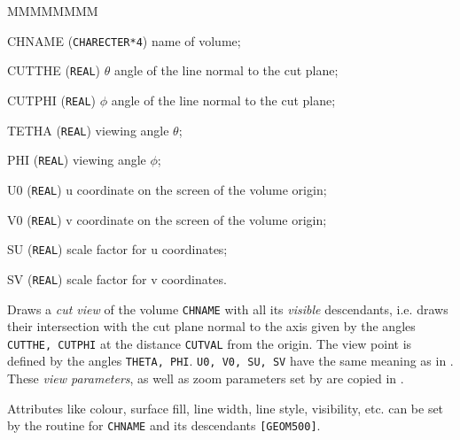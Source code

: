        
 
\begin{DLtt}{MMMMMMMM}
\item[CHNAME] ({\tt CHARECTER*4}) name of volume;
\item[CUTTHE] ({\tt REAL}) $\theta$ angle of the line normal to the cut plane;
\item[CUTPHI] ({\tt REAL}) $\phi$ angle of the line normal to the cut plane;
\item[TETHA]  ({\tt REAL}) viewing angle $\theta$;
\item[PHI]    ({\tt REAL}) viewing angle $\phi$;
\item[U0]     ({\tt REAL}) u coordinate on the screen of the volume origin;
\item[V0]     ({\tt REAL}) v  coordinate on the screen of the volume origin;
\item[SU]     ({\tt REAL}) scale factor for u  coordinates;
\item[SV]     ({\tt REAL}) scale factor for v   coordinates.
\end{DLtt}

Draws a {\it cut view} of the volume {\tt CHNAME}
with all its {\it visible} descendants, i.e. draws their intersection with
the cut plane normal to the axis
given by the angles {\tt CUTTHE, CUTPHI} at the distance {\tt CUTVAL}
from the origin.
The view point is defined by the angles {\tt THETA, PHI}.
{\tt U0, V0, SU, SV} have the same meaning as in .
These {\it view parameters}, as well as zoom parameters set by 
are copied in .

Attributes like colour, surface fill, line width, line style, visibility, etc.
can be set by the  routine for {\tt CHNAME}
and its descendants {\tt [GEOM500]}.
 
